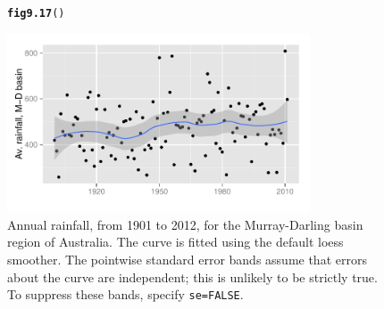 \documentclass[12pt, a4paper,  BCOR=8.25mm, DIV=15]{scrartcl}\usepackage[]{graphicx}\usepackage[]{color}
\makeatletter
\newcommand{\hlstd}[1]{\textcolor[rgb]{0.345,0.345,0.345}{#1}}%
\newcommand{\hlkwd}[1]{\textcolor[rgb]{0.737,0.353,0.396}{\textbf{#1}}}%
\newenvironment{kframe}{%
 \def\at@end@of@kframe{}%
 \ifinner\ifhmode%
  \def\at@end@of@kframe{\end{minipage}}%
  \begin{minipage}{\columnwidth}%
 \fi\fi%
 \def\FrameCommand##1{\hskip\@totalleftmargin \hskip-\fboxsep
 \colorbox{shadecolor}{##1}\hskip-\fboxsep
     \hskip-\linewidth \hskip-\@totalleftmargin \hskip\columnwidth}%
 \MakeFramed {\advance\hsize-\width
   \@totalleftmargin\z@ \linewidth\hsize
   \@setminipage}}%
 {\par\unskip\endMakeFramed%
 \at@end@of@kframe}
\newenvironment{knitrout}{}{} %
\makeatother
\begin{document}
\begin{figure}[ht]
\begin{knitrout}
\color{fgcolor}\begin{kframe}
\begin{alltt}
\hlkwd{fig9.17}\hlstd{()}
\end{alltt}
\end{kframe}

{\centering \includegraphics[width=0.8\textwidth]{figs/gph-fig9_17e-1} 

}



\end{knitrout}
\caption{Annual rainfall, from 1901 to 2012, for the Murray-Darling
  basin region of Australia.  The curve is fitted using the default
  loess smoother. The pointwise standard error bands assume that
  errors about the curve are independent; this is unlikely to be
  strictly true. To suppress these bands, specify
  \texttt{se=FALSE}.\label{fig:ggrain}}
\end{figure}
\end{document}
